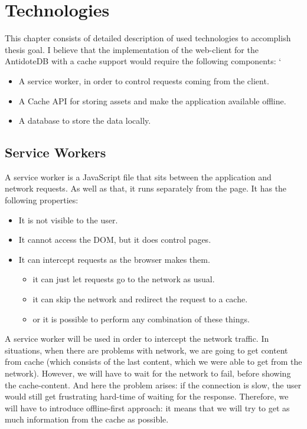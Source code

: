 \chapter{Technologies}
\label{Technologies}

This chapter consists of detailed description of used technologies to accomplish thesis goal.
I believe that the implementation of the web-client for the AntidoteDB with a cache support would require the following components:
`
\begin{itemize}
\item{A service worker, in order to control requests coming from the client.}
\item{A Cache API for storing assets and make the application available offline.}
\item{A database to store the data locally}.

\end{itemize}

\section{Service Workers}

A service worker\cite{1} is a JavaScript file that sits between the application and network requests. As well as that, it runs separately from the page. It has the following properties:

\begin{itemize}
\item{It is not visible to the user.}
\item{It cannot access the DOM, but it does control pages.}
\item{It can intercept requests as the browser makes them.}
\begin{itemize}
\item{it can just let requests go to the network as usual.}
\item{it can skip the network and redirect the request to a cache.}
\item{or it is possible to perform any combination of these things.}

\end{itemize}
\end{itemize}

A service worker will be used in order to intercept the network traffic. In situations, when there are problems with network, we are going to get content from cache (which consists of the last content, which we were able to get from the network). However, we will have to wait for the network to fail, before showing the cache-content. And here the problem arises: if the connection is slow, the user would still get frustrating hard-time of waiting for the response. Therefore, we will have to introduce offline-first approach: it means that we will try to get as much information from the cache as possible. 

